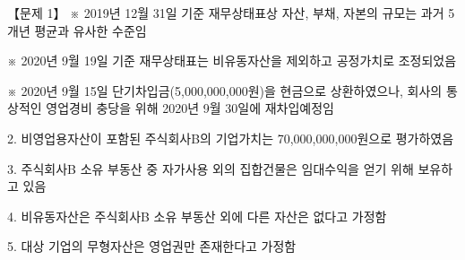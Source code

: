 \begin{longquestion}{【문제 1】}
※ 2019년 12월 31일 기준 재무상태표상 자산, 부채, 자본의 규모는 과거 5개년 평균과 유사한 수준임 \par
※ 2020년 9월 19일 기준 재무상태표는 비유동자산을 제외하고 공정가치로 조정되었음 \par
※ 2020년 9월 15일 단기차입금(5,000,000,000원)을 현금으로 상환하였으나, 회사의 통상적인 영업경비 충당을 위해 2020년 9월 30일에 재차입예정임 \par
2. 비영업용자산이 포함된 주식회사B의 기업가치는 70,000,000,000원으로 평가하였음 \par
3. 주식회사B 소유 부동산 중 자가사용 외의 집합건물은 임대수익을 얻기 위해 보유하고 있음 \par
4. 비유동자산은 주식회사B 소유 부동산 외에 다른 자산은 없다고 가정함 \par
5. 대상 기업의 무형자산은 영업권만 존재한다고 가정함 \par
\end{longquestion}
